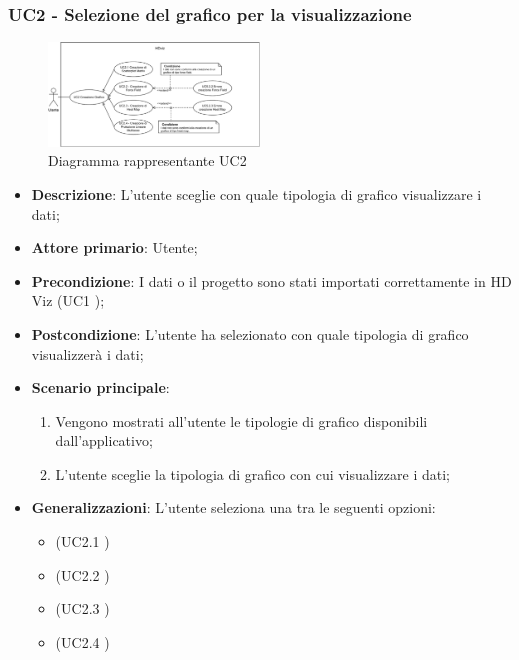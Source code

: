 \subsubsection{UC2 - Selezione del grafico per la visualizzazione}
\label{sub:uc2}

\begin{figure}[h]
    \centering
    \includegraphics[width=0.5\textwidth]{componenti/casi-duso/diagrammi/UC2.pdf}
    \caption{Diagramma rappresentante UC2}
    \label{fig:UC2}
\end{figure}

\begin{itemize}
	\item \textbf{Descrizione}: L'utente sceglie con quale tipologia di grafico visualizzare i dati;
	\item \textbf{Attore primario}: Utente;
	\item \textbf{Precondizione}: I dati o il progetto sono stati importati correttamente in HD Viz (UC1 );
	\item \textbf{Postcondizione}: L'utente ha selezionato con quale tipologia di grafico visualizzerà i dati;
	\item \textbf{Scenario principale}:
		\begin{enumerate}
			\item Vengono mostrati all'utente le tipologie di grafico disponibili dall'applicativo;
			\item L'utente sceglie la tipologia di grafico con cui visualizzare i dati;
		\end{enumerate}
	\item \textbf{Generalizzazioni}: L'utente seleziona una tra le seguenti opzioni:
		\begin{itemize}
			\item \emph{} (UC2.1 )
			\item \emph{} (UC2.2 )
			\item \emph{} (UC2.3 )
			\item \emph{} (UC2.4 )
		\end{itemize}
\end{itemize}

